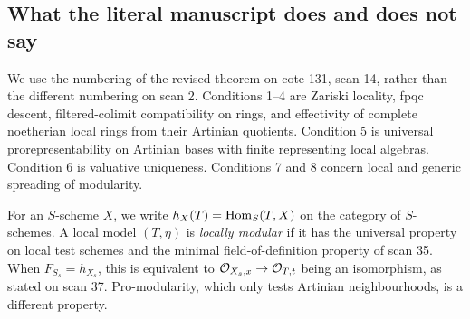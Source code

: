 \subsection{What the literal manuscript does and does not say}

We use the numbering of the revised theorem on cote 131, scan 14, rather
than the different numbering on scan 2. Conditions 1--4 are Zariski locality,
fpqc descent, filtered-colimit compatibility on rings, and effectivity of
complete noetherian local rings from their Artinian quotients. Condition 5
is universal prorepresentability on Artinian bases with finite representing
local algebras. Condition 6 is valuative uniqueness. Conditions 7 and 8
concern local and generic spreading of modularity.

For an $S$-scheme $X$, we write $h_X(T)=\operatorname{Hom}_S(T,X)$ on the category of
$S$-schemes. A local model $(T,\eta)$ is \emph{locally modular} if it has
the universal property on local test schemes and the minimal
field-of-definition property of scan 35. When $F_{S_s}=h_{X_s}$, this is
equivalent to $\mathcal O_{X_s,x}\to\mathcal O_{T,t}$ being an isomorphism, as stated
on scan 37. Pro-modularity, which only tests Artinian neighbourhoods, is
a different property.

